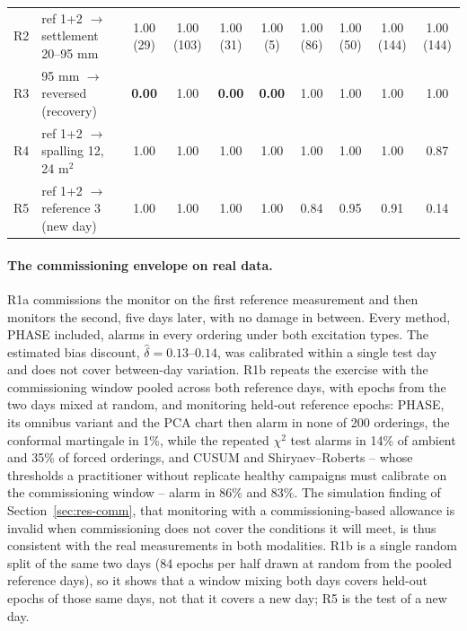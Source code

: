 \documentclass[12pt,a4paper]{article}
\newcommand{\rev}[1]{#1}
\newcommand{\rev}[1]{{\color{revcol}#1}}
\begin{document}
\begin{table}[t]
\begin{tabular}{llcccccccc}
R2  & ref 1+2 $\to$ settlement 20--95 mm & 1.00 (29) & 1.00 (103) & 1.00 (31) & 1.00 (5) & 1.00 (86) & 1.00 (50) & 1.00 (144) & 1.00 (144) \\
R3  & 95 mm $\to$ reversed (recovery) & \textbf{0.00} & 1.00 & \textbf{0.00} & \textbf{0.00} & 1.00 & 1.00 & 1.00 & 1.00 \\
R4  & ref 1+2 $\to$ spalling 12, 24 m$^2$ & 1.00 & 1.00 & 1.00 & 1.00 & 1.00 & 1.00 & 1.00 & 0.87 \\
R5  & ref 1+2 $\to$ reference 3 (new day) & 1.00 & 1.00 & 1.00 & 1.00 & 0.84 & 0.95 & 0.91 & 0.14 \\
\bottomrule
\end{tabular}
\end{table}

\paragraph{The commissioning envelope on real data.} R1a commissions the monitor on the first reference measurement and then monitors the second, five days later, with no damage in between. Every method, PHASE included, alarms in every ordering under both excitation types. The estimated bias discount, $\hat\delta=0.13$--$0.14$, was calibrated within a single test day and does not cover between-day variation. R1b repeats the exercise with the commissioning window pooled across both reference days, \rev{with epochs from the two days mixed at random,} and monitoring held-out reference epochs: PHASE, its omnibus variant and the PCA chart then alarm in none of 200 orderings, the conformal martingale in 1\%, while the repeated $\chi^2$ test alarms in 14\% of ambient and 35\% of forced orderings, and CUSUM and Shiryaev--Roberts -- whose thresholds a practitioner without replicate healthy campaigns must calibrate on the commissioning window -- alarm in 86\% and 83\%. The simulation finding of Section~\ref{sec:res-comm}, that monitoring with a commissioning-based allowance is invalid when commissioning does not cover the conditions it will meet, is thus consistent with the real measurements in both modalities. \rev{R1b is a single random split of the same two days (84 epochs per half drawn at random from the pooled reference days), so it shows that a window mixing both days covers held-out epochs of those same days, not that it covers a new day; R5 is the test of a new day.}
\end{document}
